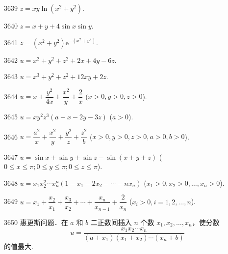 \begin{prob}[S]{3639}
$z = xy\ln(x^2 + y^2)$.
\end{prob}

\begin{prob}[S]{3640}
$z = x + y + 4\sin x \sin y$.
\end{prob}

\begin{prob}[S]{3641}
$z = (x^2 + y^2)\mathrm{e}^{-(x^2 + y^2)}$.
\end{prob}

\begin{prob}[S]{3642}
$u = x^2 + y^2 + z^2 + 2x + 4y - 6z$.
\end{prob}

\begin{prob}[S]{3643}
$u = x^3 + y^2 + z^2 + 12xy + 2z$.
\end{prob}

\begin{prob}[S]{3644}
$u = x + \dfrac{y^2}{4x} + \dfrac{x^2}{y} + \dfrac{2}{x}$ ($x > 0, y > 0, z > 0$).
\end{prob}

\begin{prob}[S]{3645}
$u = xy^2 z^3(a - x - 2y - 3z)$ ($a > 0$).
\end{prob}

\begin{prob}[S]{3646}
$u = \dfrac{a^2}{x} + \dfrac{x^2}{y} + \dfrac{y^2}{z} + \dfrac{z^2}{b}$ ($x > 0, y > 0, z > 0, a > 0, b > 0$).
\end{prob}

\begin{prob}[S]{3647}
$u = \sin x + \sin y + \sin z - \sin(x + y + z)$ ($0 \leqslant x \leqslant \pi; 0 \leqslant y \leqslant \pi; 0 \leqslant z \leqslant \pi$).
\end{prob}

\begin{prob}[S]{3648}
$u = x_1 x_2^2 \cdots x_n^n (1 - x_1 - 2x_2 - \cdots - nx_n)$ ($x_1 > 0, x_2 > 0, \dots, x_n > 0$).
\end{prob}

\begin{prob}[S]{3649}
$u = x_1 + \dfrac{x_2}{x_1} + \dfrac{x_3}{x_2} + \cdots + \dfrac{x_n}{x_{n-1}} + \dfrac{2}{x_n}$ ($x_i > 0, i = 1, 2, \dots, n$).
\end{prob}

\begin{prob}[M]{3650}
惠更斯问题．在 $a$ 和 $b$ 二正数间插入 $n$ 个数 $x_1, x_2, \dots, x_n$，使分数
\[
u = \frac{x_1 x_2 \cdots x_n}{(a + x_1)(x_1 + x_2)\cdots(x_n + b)}
\]
的值最大.
\end{prob}

